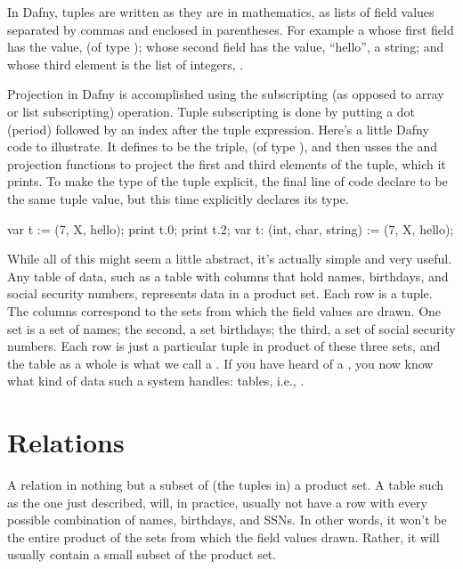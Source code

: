 \documentclass[letterpaper,10pt,english]{sphinxmanual}
\begin{document}
In Dafny, tuples are written as they are in mathematics, as lists of
field values separated by commas and enclosed in parentheses.  For
example  a  whose
first field has the value,  (of type ); whose second field has
the value, “hello”, a string; and whose third element is the list of
integers, \sphinxstyleemphasis{{[}2, 4, 6{]}}.

Projection in Dafny is accomplished using the  subscripting (as
opposed to array or list subscripting) operation. Tuple subscripting is
done by putting a dot (period) followed by an index after the tuple
expression. Here’s a little Dafny code to illustrate. It defines 
to be the triple,  (of type ),
and then usses the  and  projection functions to project the
first and third elements of the tuple, which it prints. To make the
type of the tuple explicit, the final line of code declare  to be
the same tuple value, but this time explicitly declares its type.

\begin{sphinxVerbatim}[commandchars=\\\{\}]
var t := (7, \PYGZsq{}X\PYGZsq{}, \PYGZdq{}hello\PYGZdq{});
print t.0;
print t.2;
var t\PYGZsq{}: (int, char, string) := (7, \PYGZsq{}X\PYGZsq{}, \PYGZdq{}hello\PYGZdq{});
\end{sphinxVerbatim}

While all of this might seem a little abstract, it’s actually simple
and very useful. Any table of data, such as a table with columns that
hold names, birthdays, and social security numbers, represents data in
a product set. Each row is a tuple. The columns correspond to the sets
from which the field values are drawn. One set is a set of names; the
second, a set birthdays; the third, a set of social security numbers.
Each row is just a particular tuple in product of these three sets,
and the table as a whole is what we call a . If you have
heard of a , you now know what kind of data such
a system handles: tables, i.e., .


\section{Relations}
\label{\detokenize{07-set-theory:relations}}
A relation in nothing but a subset of (the tuples in) a product set. A
table such as the one just described, will, in practice, usually not
have a row with every possible combination of names, birthdays, and
SSNs. In other words, it won’t be the entire product of the sets from
which the field values drawn. Rather, it will usually contain a small
subset of the product set.
\end{document}
